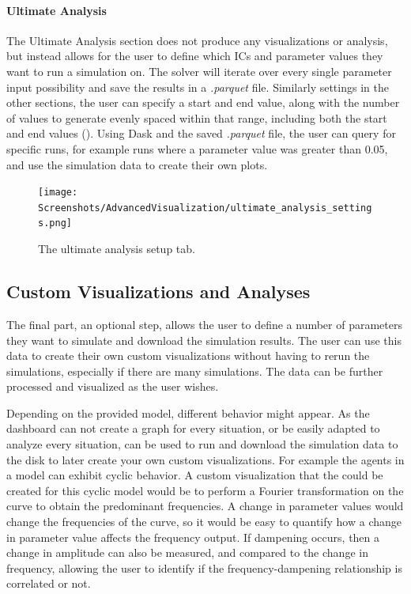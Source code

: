 \paragraph{Ultimate Analysis}
\label{sec:ultimate_analysis}
The Ultimate Analysis section does not produce any visualizations or analysis, but instead allows for the user to define which ICs and parameter values they want to run a simulation on.
The solver will iterate over every single parameter input possibility and save the results in a \textit{.parquet} file.
Similarly settings in the other sections, the user can specify a start and end value, along with the number of values to generate evenly spaced within that range, including both the start and end values ().
\newline
Using Dask and the saved \textit{.parquet} file, the user can query for specific runs, for example runs where a parameter value was greater than 0.05, and use the simulation data to create their own plots.
\begin{figure}
    \centering
    \texttt{[image: Screenshots/AdvancedVisualization/ultimate\_analysis\_settings.png]}
    \caption{
        The ultimate analysis setup tab. 
    }
    \label{fig:ss:av:ultimate_analysis_settings}
\end{figure}

\subsection{Custom Visualizations and Analyses} 
\label{sec:custom_visualizations_and_framework}
The final part, an optional step, allows the user to define a number of parameters they want to simulate and download the simulation results. 
The user can use this data to create their own custom visualizations without having to rerun the simulations, especially if there are many simulations. 
The data can be further processed and visualized as the user wishes. 

Depending on the provided model, different behavior might appear. 
As the dashboard can not create a graph for every situation, or be easily adapted to analyze every situation,  can be used to run and download the simulation data to the disk to later create your own custom visualizations. 
For example the agents in a model can exhibit cyclic behavior. 
A custom visualization that the could be created for this cyclic model would be to perform a Fourier transformation on the curve to obtain the predominant frequencies. 
A change in parameter values would change the frequencies of the curve, so it would be easy to quantify how a change in parameter value affects the frequency output. 
If dampening occurs, then a change in amplitude can also be measured, and compared to the change in frequency, allowing the user to identify if the frequency-dampening relationship is correlated or not. 

